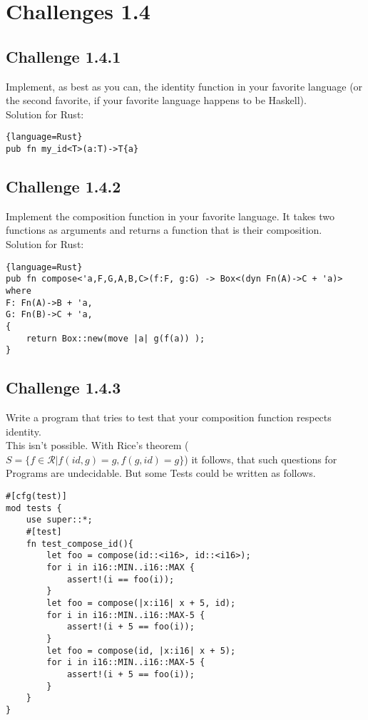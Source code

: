 \documentclass[11pt]{article}
\begin{document}
\section*{Challenges 1.4}
    \subsection*{Challenge 1.4.1}
        Implement, as best as you can, the identity function in your favorite
        language (or the second favorite, if your favorite language
        happens to be Haskell).\\
        Solution for Rust:

        \begin{lstlisting}{language=Rust}
pub fn my_id<T>(a:T)->T{a}
        \end{lstlisting}

    \subsection*{Challenge 1.4.2}
        Implement the composition function in your favorite language. It
        takes two functions as arguments and returns a function that is
        their composition.\\
        Solution for Rust:

        \begin{lstlisting}{language=Rust}
pub fn compose<'a,F,G,A,B,C>(f:F, g:G) -> Box<(dyn Fn(A)->C + 'a)>
where
F: Fn(A)->B + 'a,
G: Fn(B)->C + 'a, 
{
    return Box::new(move |a| g(f(a)) );
}
        \end{lstlisting}

    \subsection*{Challenge 1.4.3}
        Write a program that tries to test that your composition function respects identity.\\
        This isn't possible. With Rice's theorem ($S = \{ f \in \mathcal{R} | f(id,g) = g, f(g, id) = g\}$) it follows, that such questions for Programs are undecidable. But some Tests could be written as follows.

        \begin{lstlisting}
#[cfg(test)]
mod tests {
    use super::*;
    #[test]
    fn test_compose_id(){
        let foo = compose(id::<i16>, id::<i16>);
        for i in i16::MIN..i16::MAX {
            assert!(i == foo(i));
        }
        let foo = compose(|x:i16| x + 5, id);
        for i in i16::MIN..i16::MAX-5 {
            assert!(i + 5 == foo(i));
        }
        let foo = compose(id, |x:i16| x + 5);
        for i in i16::MIN..i16::MAX-5 {
            assert!(i + 5 == foo(i));
        }
    }
}
        \end{lstlisting}
\end{document}
